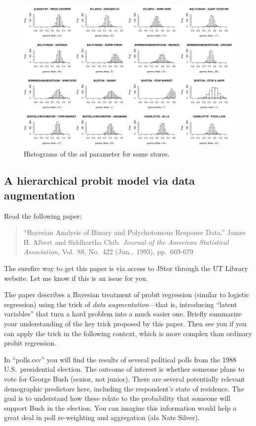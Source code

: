\documentclass{article}
\begin{document}
\begin{enumerate}
\begin{figure}[h]
\includegraphics[width=\textwidth]{gamma.jpeg}
\caption{Histograms of the ad parameter for some stores.}
\end{figure}


\end{enumerate}

\subsection{A hierarchical probit model via data augmentation}

Read the following paper:
\begin{quotation}
``Bayesian Analysis of Binary and Polychotomous Response Data.''  James H. Albert and Siddhartha Chib.  \textit{Journal of the American Statistical Association}, Vol.~88, No.~422 (Jun.,~1993), pp.~669-679
\end{quotation}
The surefire way to get this paper is via access to JStor through the UT Library website.  Let me know if this is an issue for you.

The paper describes a Bayesian treatment of probit regression (similar to logistic regression) using the trick of \textit{data augmentation}---that is, introducing ``latent variables'' that turn a hard problem into a much easier one.  Briefly summarize your understanding of the key trick proposed by this paper.  Then see you if you can apply the trick in the following context, which is more complex than ordinary probit regression.

In ``polls.csv'' you will find the results of several political polls from the 1988 U.S.~presidential election.  The outcome of interest is whether someone plans to vote for George Bush (senior, not junior).  There are several potentially relevant demographic predictors here, including the respondent's state of residence.  The goal is to understand how these relate to the probability that someone will support Bush in the election.  You can imagine this information would help a great deal in poll re-weighting and aggregation (ala Nate Silver).
\end{document}
